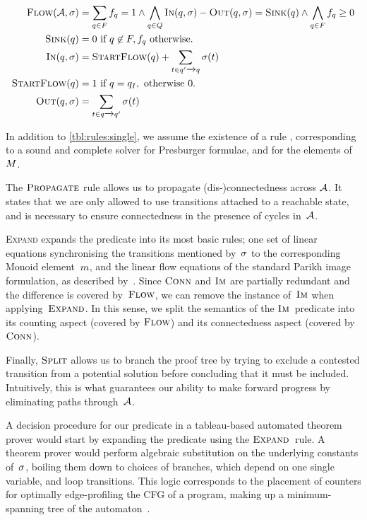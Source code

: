 \documentclass[acmsmall,review,anonymous,screen]{acmart}\settopmatter{printfolios=true,printccs=true,printacmref=true}
\theoremstyle{definition}
\begin{document}
\[
\begin{aligned}
  \textsc{Flow}(\mathcal{A}, \operatorname{\sigma}) &= \sum\limits_{q \in F} f_q = 1 \land \bigwedge\limits_{q \in Q} \operatorname{\textsc{In}}(q, \operatorname{\sigma}) - \operatorname{\textsc{Out}}(q, \operatorname{\sigma}) = \operatorname{\textsc{Sink}}(q) \land
  \bigwedge\limits_{q \in F} f_q \geq 0\\
  \operatorname{\textsc{Sink}}(q) & = 0 \text{ if } q \not\in F, f_q \text{ otherwise.} \\
  \operatorname{\textsc{In}}(q, \operatorname{\sigma}) & = \operatorname{\textsc{StartFlow}}(q) + \sum_{t \in q' \xrightarrow{} q} \operatorname{\sigma}(t)\\
  \operatorname{\textsc{StartFlow}}(q)  &= 1 \text{ if } q = q_I, \text{ otherwise $0$.} \\
  \operatorname{\textsc{Out}}(q, \operatorname{\sigma}) &= \sum_{t \in q \xrightarrow{} q'} \operatorname{\sigma}(t)
\end{aligned}
\]

In addition to \cref{tbl:rules:single}, we assume the existence of a rule
\PresburgerClose{}, corresponding to a sound and complete solver for Presburger
formulae, and for the elements of~$M$.

The $\textsc{Propagate}{}$ rule allows us to propagate (dis-)connectedness across
$\mathcal{A}$. It states that we are only allowed to use transitions attached to
a reachable state, and is necessary to ensure connectedness in the presence of
cycles in~$\mathcal{A}$.

\textsc{Expand} expands the predicate into its most basic rules; one set of
linear equations synchronising the transitions mentioned by~$\operatorname{\sigma}$ to the
corresponding Monoid element~$m$, and the linear flow equations of
the standard Parikh image formulation, as described by~\FlowEq. Since
$\operatorname{\textsc{Conn}}$ and $\operatorname{\textsc{Im}}$ are partially redundant and the difference is covered
by~$\textsc{Flow}$, we can remove the instance of~$\operatorname{\textsc{Im}}$ when applying~$\textsc{Expand}$. In
this sense, we split the semantics of the $\operatorname{\textsc{Im}}$~predicate into its counting
aspect (covered by $\textsc{Flow}$) and its connectedness aspect (covered by
$\operatorname{\textsc{Conn}}$).

Finally, $\textsc{Split}{}$ allows us to branch the proof tree by trying to exclude a
contested transition from a potential solution before concluding that it must be
included. Intuitively, this is what guarantees our ability to make forward
progress by eliminating paths through~$\mathcal{A}$.

A decision procedure for our predicate in a tableau-based automated theorem
prover would start by expanding the predicate using the $\textsc{Expand}{}$~rule. A
theorem prover would perform algebraic substitution on the underlying constants
of~$\operatorname{\sigma}$, boiling them down to choices of branches, which depend on one
single variable, and loop transitions. This logic corresponds to the placement
of counters for optimally edge-profiling the CFG of a program, making up a
minimum-spanning tree of the automaton~\cite{path-profiling}.
\end{document}
